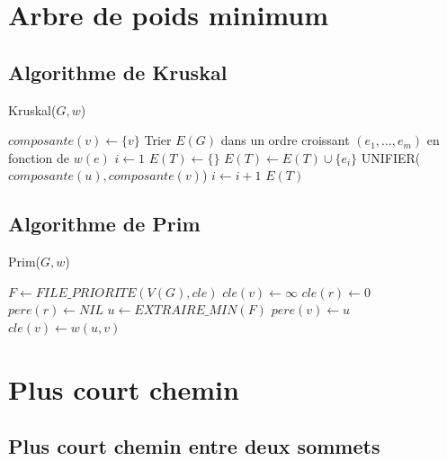 \documentclass[11pt,a4paper]{report}
\begin{document}
\section{Arbre de poids minimum}

\subsection{Algorithme de Kruskal}

\begin{algorithm}
\caption{Kruskal($G, w$)}
\begin{algorithmic}[1]
\STATE $composante(v) \leftarrow \{v\}$
\ENDFOR
\STATE Trier $E(G)$ dans un ordre croissant $(e_1, \ldots, e_m)$ en fonction de $w(e)$
\STATE $i \leftarrow 1$
\STATE $E(T) \leftarrow \{\}$
\STATE $E(T) \leftarrow E(T) \cup \{e_i\}$
\STATE UNIFIER($composante(u), composante(v)$)
\ENDIF
\STATE $i \leftarrow i+1$
\ENDWHILE
\RETURN $E(T)$
\end{algorithmic}
\end{algorithm}


\subsection{Algorithme de Prim}

\begin{algorithm}
\caption{Prim($G, w$)}
\begin{algorithmic}[1]
\STATE $F \leftarrow FILE\_PRIORITE(V(G), cle)$
\STATE $cle(v) \leftarrow \infty$
\ENDFOR
\STATE $cle(r) \leftarrow 0$
\STATE $pere(r) \leftarrow NIL$
\STATE $u \leftarrow EXTRAIRE\_MIN(F)$
\STATE $pere(v) \leftarrow u$
\STATE $cle(v)  \leftarrow w(u,v)$
\ENDIF
\ENDFOR
\ENDWHILE
\end{algorithmic}
\end{algorithm}

\section{Plus court chemin}

\subsection{Plus court chemin entre deux sommets}
\end{document}
